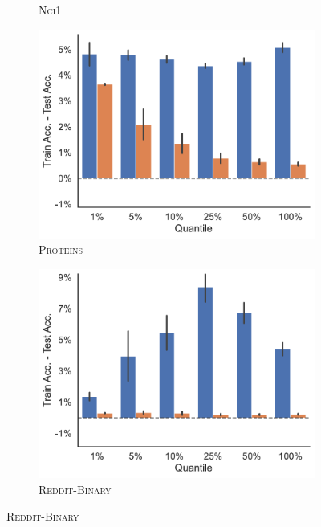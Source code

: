 \begin{figure}[!htb]
\begin{subfigure}[b]{0.3\textwidth}
		\caption{\textsc{Nci1}}
	\end{subfigure}
	\hfill
	\begin{subfigure}[b]{0.3\textwidth}
		\centering
		\includegraphics[width=\textwidth]{Figures/train_test_diff_PROTEINS.pdf}
		\vspace*{-4ex} 
		\caption{\textsc{Proteins}}
	\end{subfigure}
	\hfill
	\begin{subfigure}[b]{0.3\textwidth}
		\centering
		\includegraphics[width=\textwidth]{Figures/train_test_diff_REDDIT-BINARY.pdf}
		\vspace*{-4ex} 
		\caption{\textsc{Reddit-Binary}}
	\end{subfigure}

\end{figure}
